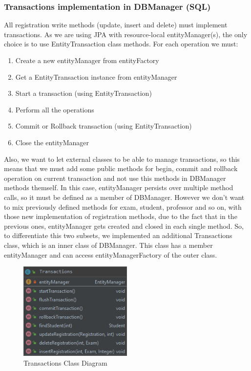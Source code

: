 \documentclass{report}
\begin{document}
\subsubsection{Transactions implementation in DBManager (SQL)}
All registration write methods (update, insert and delete) must implement transactions. As we are using JPA with resource-local entityManager(s), the only choice is to use EntityTransaction class methods. For each operation we must:
\begin{enumerate}
	\item Create a new entityManager from entityFactory
	\item Get a EntityTransaction instance from entityManager
	\item Start a transaction (using EntityTransaction)
	\item Perform all the operations
	\item Commit or Rollback transaction (using EntityTransaction)
	\item Close the entityManager
\end{enumerate}
Also, we want to let external classes to be able to manage transactions, so this means that we must add some public methods for begin, commit and rollback operation on current transaction and not use this methods in DBManager methods themself. In this case, entityManager persists over multiple method calls, so it must be defined as a member of DBManager. However we don't want to mix previously defined methods for exam, student, professor and so on, with those new implementation of registration methods, due to the fact that in the previous ones, entityManager gets created and closed in each single method. So, to differentiate this two subsets, we implemented an additional Transactions class, which is an inner class of DBManager. This class has a member entityManager and can access entityManagerFactory of the outer class.


\begin{figure} [h!]
	\centering
	\includegraphics[width=0.5\textwidth]{TransactionsClassDia.png}
	\caption{Transactions Class Diagram}
	\label{fig:transactions-dia}
\end{figure}
\end{document}

